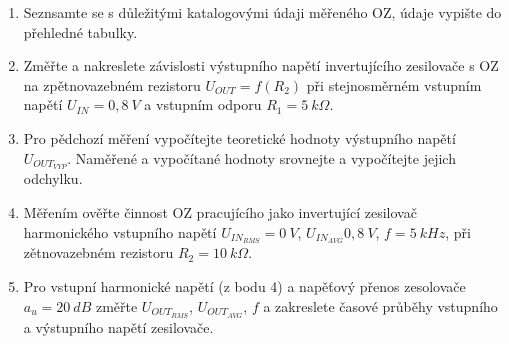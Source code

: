 \begin{minipage}[H][11.48cm][c]{0.8\textwidth}
  \begin{enumerate}
    \item
      Seznsamte se s důležitými katalogovými údaji měřeného OZ, údaje vypište do přehledné tabulky.
    \item
      Změřte a nakreslete závislosti výstupního napětí invertujícího zesilovače s OZ na zpětnovazebném rezistoru $U_{OUT} = f(R_2)$ při stejnosměrném vstupním napětí $U_{IN} = 0,8~V$ a vstupním odporu $R_1 = 5~k\Omega$.
    \item
    	Pro pědchozí měření vypočítejte teoretické hodnoty výstupního napětí $U_{OUT_{VYP}}$. Naměřené a vypočítané hodnoty srovnejte a vypočítejte jejich odchylku.
    \item
      Měřením ověřte činnost OZ pracujícího jako invertující zesilovač harmonického vstupního napětí $U_{IN_{RMS}} = 0~V$, $U_{IN_{AVG}} 0,8~V$, $f = 5~kHz$, při zětnovazebném rezistoru $R_2 = 10~k\Omega$.
    \item
      Pro vstupní harmonické napětí (z bodu 4) a napěťový přenos zesolovače $a_u = 20~dB$ změřte $U_{OUT_{RMS}}$, $U_{OUT_{AVG}}$, $f$ a zakreslete časové průběhy vstupního a výstupního napětí zesilovače.
  \end{enumerate}

\end{minipage}


